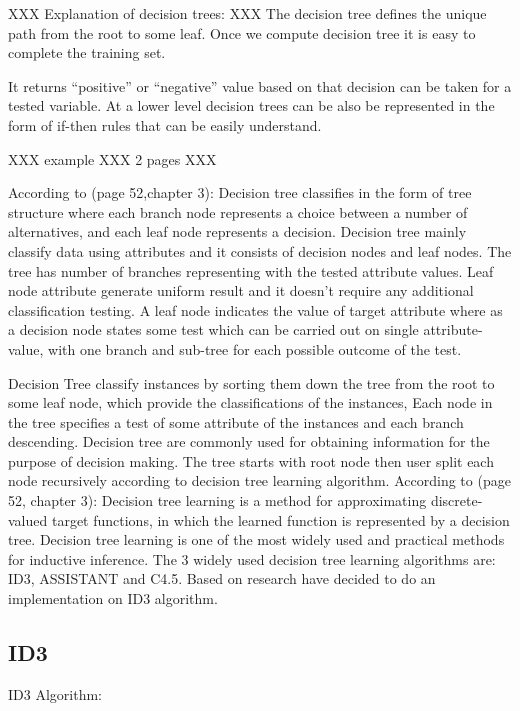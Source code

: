 \documentclass{article}
\begin{document}
XXX Explanation of decision trees: XXX  The decision tree defines the unique path from the root to some leaf. Once we compute decision tree it is easy to complete the training set. 

It returns ``positive'' or ``negative'' value based on that decision can be taken for a tested variable. At a lower level decision trees can be also be represented in the form of if-then rules that can be easily understand.

XXX example XXX 2 pages XXX

According to \cite{Mitchell1997MachineLearning}(page 52,chapter 3): Decision tree classifies in the form of tree structure where each branch node represents a choice between a number of alternatives, and each leaf node represents a decision. Decision tree mainly classify data using attributes and it consists of decision nodes and leaf nodes. The tree has number of branches representing with the tested attribute values. Leaf node attribute generate uniform result and it doesn't require any additional classification testing. A leaf node indicates the value of target attribute where as a decision node states some test which can be carried out on single attribute-value, with one branch and sub-tree for each possible outcome of the test.

Decision Tree classify instances by sorting them down the tree from the root to some leaf node, which provide the classifications of the instances, Each node in the tree specifies a test of some attribute of the instances and each branch descending.
Decision tree are commonly used for obtaining information for the purpose of decision making. The tree starts with root node then user split each node recursively according to decision tree learning algorithm.
According to \cite{Mitchell1997MachineLearning}(page 52, chapter 3): Decision tree learning is a method for approximating discrete-valued target functions, in which the learned function is represented by a decision tree. Decision tree learning is one of the most widely used and practical methods for inductive inference. The 3 widely used decision tree learning algorithms are: ID3, ASSISTANT and C4.5. Based on research have decided to do an implementation on ID3 algorithm. 


\subsection{ID3}
\label{sec:ID3}

ID3 Algorithm:
\end{document}
